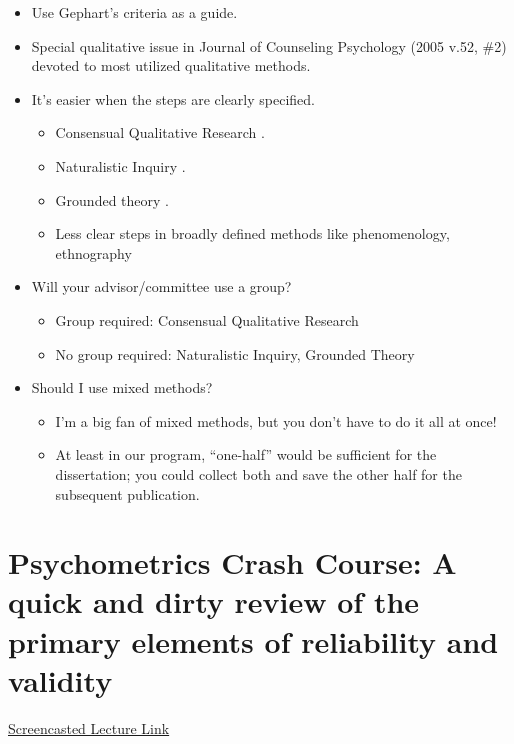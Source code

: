 \documentclass[
  english,
]{book}
\providecommand{\tightlist}{%
  \setlength{\itemsep}{0pt}\setlength{\parskip}{0pt}}
\begin{document}
\begin{itemize}
\tightlist
\item
  Use Gephart's criteria as a guide.
\item
  Special qualitative issue in Journal of Counseling Psychology (2005 v.52, \#2) devoted to most utilized qualitative methods.
\item
  It's easier when the steps are clearly specified.

  \begin{itemize}
  \tightlist
  \item
    Consensual Qualitative Research \citep{hill_consensual_2005, hill_consensual_2012}.
  \item
    Naturalistic Inquiry \citep{erlandson_doing_1993, lincoln_naturalistic_1985}.
  \item
    Grounded theory \citep{fassinger_paradigms_2005}.
  \item
    Less clear steps in broadly defined methods like phenomenology, ethnography
  \end{itemize}
\item
  Will your advisor/committee use a group?

  \begin{itemize}
  \tightlist
  \item
    Group required: Consensual Qualitative Research
  \item
    No group required: Naturalistic Inquiry, Grounded Theory
  \end{itemize}
\item
  Should I use mixed methods?

  \begin{itemize}
  \tightlist
  \item
    I'm a big fan of mixed methods, but you don't have to do it all at once!
  \item
    At least in our program, ``one-half'' would be sufficient for the dissertation; you could collect both and save the other half for the subsequent publication.
  \end{itemize}
\end{itemize}

\hypertarget{Psychometrix}{%
\chapter{Psychometrics Crash Course: A quick and dirty review of the primary elements of reliability and validity}\label{Psychometrix}}

\href{https://spu.hosted.panopto.com/Panopto/Pages/Viewer.aspx?pid=0a485840-5caa-484b-ba16-ac37017d6b05}{Screencasted Lecture Link}
\end{document}
